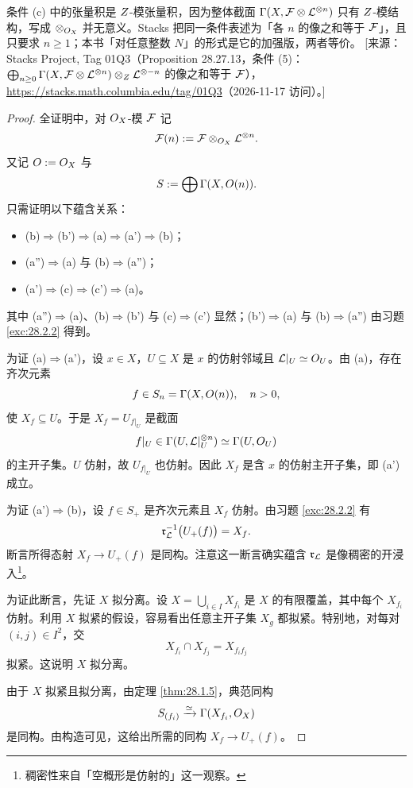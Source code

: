 \begin{yizhu}
条件 (c) 中的张量积是 $Z$-模张量积，因为整体截面 $\Gamma(X,\mathcal{F}\otimes\mathcal{L}^{\otimes n})$ 只有 $Z$-模结构，写成 $\otimes_{O_X}$ 并无意义。Stacks 把同一条件表述为「各 $n$ 的像之和等于 $\mathcal{F}$」，且只要求 $n\ge 1$；本书「对任意整数 $N$」的形式是它的加强版，两者等价。
[来源：Stacks Project, Tag 01Q3（Proposition 28.27.13，条件 (5)：$\bigoplus_{n\ge0}\Gamma(X,\mathcal{F}\otimes\mathcal{L}^{\otimes n})\otimes_Z\mathcal{L}^{\otimes -n}$ 的像之和等于 $\mathcal{F}$），\url{https://stacks.math.columbia.edu/tag/01Q3}（2026-11-17 访问）。]
\end{yizhu}

\begin{proof}
全证明中，对 $O_X$-模 $\mathcal{F}$ 记
\[
\mathcal{F}(n) := \mathcal{F}\otimes_{O_X}\mathcal{L}^{\otimes n}.
\]
又记 $O:=O_X$ 与
\[
S := \bigoplus\Gamma(X,O(n)).
\]
只需证明以下蕴含关系：
\begin{itemize}[leftmargin=1.6em,itemsep=0.15ex]
  \item (b)$\Rightarrow$(b')$\Rightarrow$(a)$\Rightarrow$(a')$\Rightarrow$(b)；
  \item (a'')$\Rightarrow$(a) 与 (b)$\Rightarrow$(a'')；
  \item (a')$\Rightarrow$(c)$\Rightarrow$(c')$\Rightarrow$(a)。
\end{itemize}
其中 (a'')$\Rightarrow$(a)、(b)$\Rightarrow$(b') 与 (c)$\Rightarrow$(c') 显然；(b')$\Rightarrow$(a) 与 (b)$\Rightarrow$(a'') 由习题 \ref{exc:28.2.2} 得到。

为证 (a)$\Rightarrow$(a')，设 $x\in X$，$U\subseteq X$ 是 $x$ 的仿射邻域且 $\mathcal{L}|_U\simeq O_U$。由 (a)，存在齐次元素
\[
f\in S_n=\Gamma(X,O(n)),\quad n>0,
\]
使 $X_f\subseteq U$。于是 $X_f=U_{f|_U}$ 是截面
\[
f|_U\in\Gamma(U,\mathcal{L}|_U^{\otimes n})\simeq\Gamma(U,O_U)
\]
的主开子集。$U$ 仿射，故 $U_{f|_U}$ 也仿射。因此 $X_f$ 是含 $x$ 的仿射主开子集，即 (a') 成立。

为证 (a')$\Rightarrow$(b)，设 $f\in S_+$ 是齐次元素且 $X_f$ 仿射。由习题 \ref{exc:28.2.2} 有
\[
\mathfrak r_{\mathcal{L}}^{-1}\bigl(U_+(f)\bigr)=X_f.
\]
断言所得态射 $X_f\to U_+(f)$ 是同构。注意这一断言确实蕴含 $\mathfrak r_{\mathcal{L}}$ 是像稠密的开浸入\footnote{稠密性来自「空概形是仿射的」这一观察。}。

为证此断言，先证 $X$ 拟分离。设 $X=\bigcup_{i\in I}X_{f_i}$ 是 $X$ 的有限覆盖，其中每个 $X_{f_i}$ 仿射。利用 $X$ 拟紧的假设，容易看出任意主开子集 $X_g$ 都拟紧。特别地，对每对 $(i,j)\in I^2$，交
\[
X_{f_i}\cap X_{f_j}=X_{f_if_j}
\]
拟紧。这说明 $X$ 拟分离。

由于 $X$ 拟紧且拟分离，由定理 \ref{thm:28.1.5}，典范同构
\[
S_{(f_i)}\xrightarrow{\simeq}\Gamma(X_{f_i},O_X)
\]
是同构。由构造可见，这给出所需的同构 $X_f\to U_+(f)$。


\end{proof}
